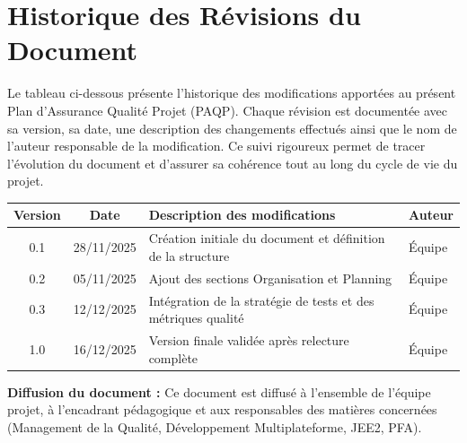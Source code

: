\documentclass[12pt,a4paper]{report}
\begin{document}
\tableofcontents
\newpage

\chapter*{Historique des Révisions du Document}

Le tableau ci-dessous présente l'historique des modifications apportées au présent Plan d'Assurance Qualité Projet (PAQP). Chaque révision est documentée avec sa version, sa date, une description des changements effectués ainsi que le nom de l'auteur responsable de la modification. Ce suivi rigoureux permet de tracer l'évolution du document et d'assurer sa cohérence tout au long du cycle de vie du projet.

\vspace{0.5cm}

\begin{tabularx}{\textwidth}{|c|c|X|l|}
    \hline
    \textbf{Version} & \textbf{Date} & \textbf{Description des modifications} & \textbf{Auteur} \\
    \hline
    0.1 & 28/11/2025 & Création initiale du document et définition de la structure & Équipe \\
    \hline
    0.2 & 05/11/2025 & Ajout des sections Organisation et Planning & Équipe \\
    \hline
    0.3 & 12/12/2025 & Intégration de la stratégie de tests et des métriques qualité & Équipe \\
    \hline
    1.0 & 16/12/2025 & Version finale validée après relecture complète & Équipe \\
    \hline
\end{tabularx}

\vspace{1cm}

\textbf{Diffusion du document :} Ce document est diffusé à l'ensemble de l'équipe projet, à l'encadrant pédagogique et aux responsables des matières concernées (Management de la Qualité, Développement Multiplateforme, JEE2, PFA).

\newpage
\end{document}
